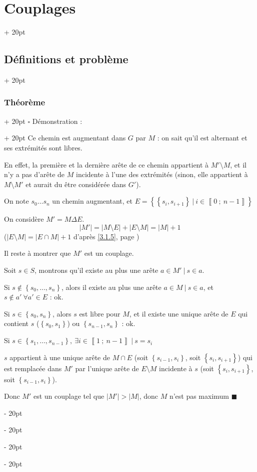 \documentclass[a4paper, 12pt, twoside]{article}
\newcommand{\nset}[2]{\left\llbracket #1\ ;\ #2 \right\rrbracket}
\newcommand{\set}[1]{\left\{ #1 \right\}}
\newcommand{\abs}[1]{\left\lvert #1 \right\rvert}
\newcommand{\ind}[1][20pt]{\advance\leftskip + #1}
\newcommand{\deind}[1][20pt]{\advance\leftskip - #1}
\newenvironment{indt}[2][20pt]{#2 \par \ind[#1]}{\par \deind} %
\newenvironment{proof}[1][{Démonstration :}]{\begin{indt}{$\square$ #1}}{$\blacksquare$ \end{indt}}
\begin{document}
\begin{indt}{\section{Couplages}}
\begin{indt}{\subsection{Définitions et problème}}
\begin{indt}{\subsubsection{Théorème}}
\begin{proof}
                    Ce chemin est augmentant dans $G$ par $M$ : on sait qu'il est alternant et ses extrémités sont libres.

                    En effet, la première et la dernière arête de ce chemin appartient à $M' \setminus M$, et il n'y a pas d'arête de $M$ incidente à l'une des extrémités (sinon, elle appartient à $M \setminus M'$ et aurait du être considérée dans $G'$).

                    \vspace{12pt}
                    
                    \boxed{\Leftarrow} On note $s_0 \ldots s_n$ un chemin augmentant, et $E = \set{\set{s_i, s_{i + 1}}\ |\ i \in \nset 0 {n - 1}}$

                    On considère $M' = M \Delta E$.
                    \[
                        \abs{M'} = \abs{M \setminus E} + \abs{E \setminus M} = \abs{M} + 1
                    \]
                    ($\abs{E \setminus M} = \abs{E \cap M} + 1$ d'après \ref{3.1.5}, page \pageref{3.1.5})

                    Il reste à montrer que $M'$ est un couplage.

                    Soit $s \in S$, montrons qu'il existe au plus une arête $a \in M'\ |\ s \in a$.

                    Si $s \notin \set{s_0, \ldots, s_n}$, alors il existe au plus une arête $a \in M\ |\ s \in a$, et $s \notin a'\ \forall a' \in E$ : ok.

                    Si $s \in \set{s_0, s_n}$, alors $s$ est libre pour $M$, et il existe une unique arête de $E$ qui contient $s$ ($\set{s_0, s_1}$) ou $\set{s_{n - 1}, s_n}$ : ok.

                    Si $s \in \set{s_1, \ldots, s_{n - 1}},\ \exists i \in \nset 1 {n - 1}\ |\ s = s_i$

                    $s$ appartient à une unique arête de $M \cap E$ (soit $\set{s_{i - 1}, s_i}$, soit $\set{s_i, s_{i + 1}}$) qui est remplacée dans $M'$ par l'unique arête de $E \setminus M$ incidente à $s$ (soit $\set{s_i, s_{i + 1}}$, soit $\set{s_{i - 1}, s_i}$).

                    Donc $M'$ est un couplage tel que $\abs{M'} > \abs{M}$, donc $M$ n'est pas maximum
                \end{proof}
            \end{indt}
        \end{indt}

        \vspace{12pt}
        

\end{indt}
\end{document}
